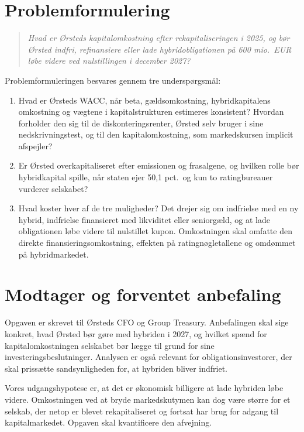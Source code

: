 \documentclass[11pt,a4paper]{article}
\begin{document}
\section{Problemformulering}

\begin{quote}
\textit{Hvad er Ørsteds kapitalomkostning efter rekapitaliseringen i 2025, og bør Ørsted indfri, refinansiere eller lade hybridobligationen på 600 mio.\ EUR løbe videre ved nulstillingen i december 2027?}
\end{quote}

Problemformuleringen besvares gennem tre underspørgsmål:

\begin{enumerate}
  \item Hvad er Ørsteds WACC, når beta, gældsomkostning, hybridkapitalens omkostning og vægtene i kapitalstrukturen estimeres konsistent? Hvordan forholder den sig til de diskonteringsrenter, Ørsted selv bruger i sine nedskrivningstest, og til den kapitalomkostning, som markedskursen implicit afspejler?
  \item Er Ørsted overkapitaliseret efter emissionen og frasalgene, og hvilken rolle bør hybridkapital spille, når staten ejer 50,1 pct.\ og kun to ratingbureauer vurderer selskabet?
  \item Hvad koster hver af de tre muligheder? Det drejer sig om indfrielse med en ny hybrid, indfrielse finansieret med likviditet eller seniorgæld, og at lade obligationen løbe videre til nulstillet kupon. Omkostningen skal omfatte den direkte finansieringsomkostning, effekten på ratingnøgletallene og omdømmet på hybridmarkedet.
\end{enumerate}

\section{Modtager og forventet anbefaling}

Opgaven er skrevet til Ørsteds CFO og Group Treasury. Anbefalingen skal sige konkret, hvad Ørsted bør gøre med hybriden i 2027, og hvilket spænd for kapitalomkostningen selskabet bør lægge til grund for sine investeringsbeslutninger. Analysen er også relevant for obligationsinvestorer, der skal prissætte sandsynligheden for, at hybriden bliver indfriet.

Vores udgangshypotese er, at det er økonomisk billigere at lade hybriden løbe videre. Omkostningen ved at bryde markedskutymen kan dog være større for et selskab, der netop er blevet rekapitaliseret og fortsat har brug for adgang til kapitalmarkedet. Opgaven skal kvantificere den afvejning.
\end{document}
